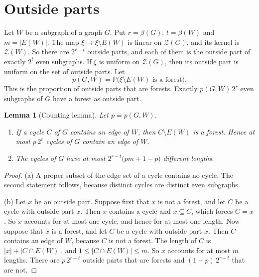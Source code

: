 \documentclass[11pt]{article}
\newtheorem{lemma}[theorem]{Lemma}
\theoremstyle{definition}
\theoremstyle{remark}
\newcommand{\Z}{\mathcal{Z}}
\newcommand{\PP}{\mathbb{P}}
\newcommand{\sm}{\setminus}
\begin{document}
\section{Outside parts}\label{sec:count}

Let $W$ be a subgraph of a graph $G$. Put $r=\beta(G)$, $t=\beta(W)$ and $m=|E(W)|$. The map
$\xi\mapsto\xi\sm E(W)$ is linear on $\Z(G)$, and its kernel is $\Z(W)$. So there are $2^{r-t}$
outside parts, and each of them is the outside part of exactly $2^{t}$ even subgraphs. If $\xi$ is
uniform on $\Z(G)$, then its outside part is uniform on the set of outside parts. Let
\[
  p(G,W)=\PP\bigl(\xi\sm E(W)\text{ is a forest}\bigr).
\]
This is the proportion of outside parts that are forests. Exactly $p(G,W)\,2^{r}$ even subgraphs of
$G$ have a forest as outside part.

\begin{lemma}[Counting lemma]\label{lem:count}
Let $p=p(G,W)$.
\begin{enumerate}
\item[\textup{(a)}] If a cycle $C$ of $G$ contains an edge of $W$, then $C\sm E(W)$ is a forest.
Hence at most $p\,2^{r}$ cycles of $G$ contain an edge of $W$.
\item[\textup{(b)}] The cycles of $G$ have at most $2^{r-t}\bigl(pm+1-p\bigr)$ different lengths.
\end{enumerate}
\end{lemma}

\begin{proof}
(a) A proper subset of the edge set of a cycle contains no cycle. The second statement follows,
because distinct cycles are distinct even subgraphs.

(b) Let $x$ be an outside part. Suppose first that $x$ is not a forest, and let $C$ be a cycle with
outside part $x$. Then $x$ contains a cycle and $x\subseteq C$, which forces $C=x$. So $x$ accounts
for at most one cycle, and hence for at most one length. Now suppose that $x$ is a forest, and let
$C$ be a cycle with outside part $x$. Then $C$ contains an edge of $W$, because $C$ is not a
forest. The length of $C$ is $|x|+|C\cap E(W)|$, and $1\le|C\cap E(W)|\le m$. So $x$ accounts for
at most $m$ lengths. There are $p\,2^{r-t}$ outside parts that are forests and $(1-p)\,2^{r-t}$
that are not.
\end{proof}
\end{document}
